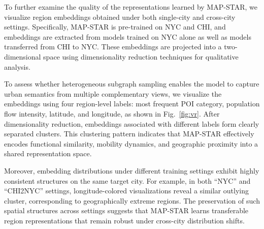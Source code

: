 To further examine the quality of the representations learned by MAP-STAR, we visualize region embeddings obtained under both single-city and cross-city settings. Specifically, MAP-STAR is pre-trained on NYC and CHI, and embeddings are extracted from models trained on NYC alone as well as models transferred from CHI to NYC. These embeddings are projected into a two-dimensional space using dimensionality reduction techniques for qualitative analysis.

To assess whether heterogeneous subgraph sampling enables the model to capture urban semantics from multiple complementary views, we visualize the embeddings using four region-level labels: most frequent POI category, population flow intensity, latitude, and longitude, as shown in Fig.~\ref{fig:vr}. After dimensionality reduction, embeddings associated with different labels form clearly separated clusters. This clustering pattern indicates that MAP-STAR effectively encodes functional similarity, mobility dynamics, and geographic proximity into a shared representation space.

Moreover, embedding distributions under different training settings exhibit highly consistent structures on the same target city. For example, in both “NYC” and “CHI2NYC” settings, longitude-colored visualizations reveal a similar outlying cluster, corresponding to geographically extreme regions. The preservation of such spatial structures across settings suggests that MAP-STAR learns transferable region representations that remain robust under cross-city distribution shifts.


